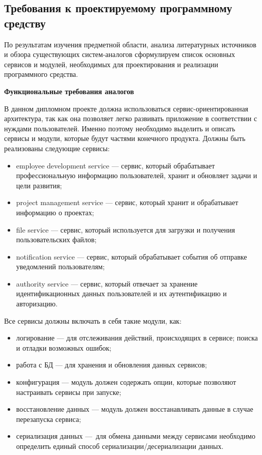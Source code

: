 \subsection{Требования к проектируемому программному средству}\label{sec:analysis:specification}

По результатам изучения предметной области, анализа литературных источников и обзора существующих систем-аналогов сформулируем список основных сервисов и модулей, необходимых для проектирования и реализации программного средства.

\bigskip
\textbf{Функциональные требования аналогов}

В данном дипломном проекте должна использоваться сервис-ориенти\-рованная архитектура, так как она позволяет легко развивать приложение в соответствии с нуждами пользователей. Именно поэтому необходимо выделить и описать сервисы и модули, которые будут частями конечного продукта. Должны быть реализованы следующие сервисы:
\begin{itemize}
    \item employee development service — сервис, который обрабатывает профессиональную информацию пользователей, хранит и обновляет задачи и цели развития;
    \item project management service — сервис, который хранит и обрабатывает информацию о проектах;
    \item file service — сервис, который используется для загрузки и получения пользовательских файлов;
    \item notification service — сервис, который обрабатывает события об отправке уведомлений пользователям;
    \item authority service — сервис, который отвечает за хранение идентификационных данных пользователей и их аутентификацию и авторизацию.
\end{itemize}

Все сервисы должны включать в себя такие модули, как:
\begin{itemize}
    \item логирование — для отслеживания действий, происходящих в сервисе; поиска и отладки возможных ошибок;
    \item работа с БД — для хранения и обновления данных сервисов;
    \item конфигурация — модуль должен содержать опции, которые позволяют настраивать сервисы при запуске;
    \item восстановление данных — модуль должен восстанавливать данные в случае перезапуска сервиса;
    \item сериализация данных — для обмена данными между сервисами необходимо определить единый способ сериализации/десериализации данных.
\end{itemize}

